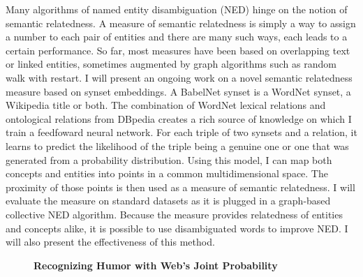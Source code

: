 \documentclass[10pt, a4paper, twopage, headinclude, footinclude, BCOR5mm]{scrartcl}
\begin{document}
\noindent
Many algorithms of named entity disambiguation (NED) hinge on the notion of semantic relatedness. A measure of semantic relatedness is simply a way to assign a number to each pair of entities and there are many such ways, each leads to a certain performance. So far, most measures have been based on overlapping text or  linked entities, sometimes augmented by graph algorithms such as random walk with restart. I will present an ongoing work on a novel semantic relatedness measure based on synset embeddings.  A BabelNet synset is a WordNet synset, a Wikipedia title or both. The combination of WordNet lexical relations and ontological relations from DBpedia creates a rich source of knowledge on which I train a feedfoward neural network. For each triple of two synsets and a relation, it learns to predict the likelihood of the triple being a genuine one or one that was generated from a probability distribution. Using this model, I can map both concepts and entities into points in a common multidimensional space. The proximity of those points is then used as a measure of semantic relatedness.  I will evaluate the measure on standard datasets as it is plugged in a graph-based collective NED algorithm. Because the measure provides relatedness of entities and concepts alike, it is possible to use disambiguated words to improve NED. I will also present the effectiveness of this method.


\newpage

\begin{figure}[t!]
\centering
\large\textbf{Recognizing Humor with Web's Joint Probability}
\vspace*{0.5cm}
\end{figure}


        \begin{table}[t!]
    \end{table}
\end{document}
